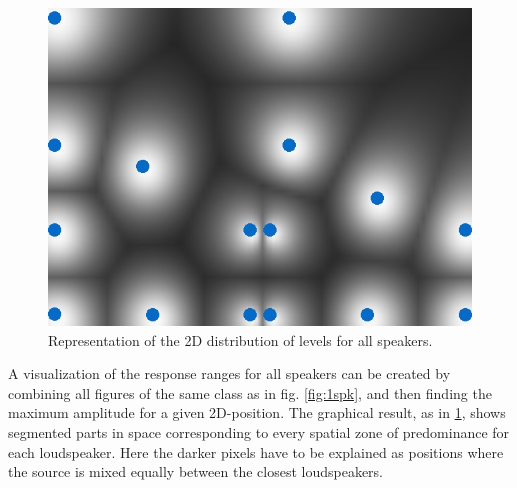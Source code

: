\documentclass[twoside,10pt]{article}
\begin{document}
\begin{figure}[ht]
\centerline{\includegraphics[scale=0.5]{all_r_6_b_0}}
\caption{Representation of the 2D distribution of levels for all speakers.}  
\label{fig:allspk2}
\end{figure}
A visualization of the response ranges for all speakers can be created by combining all figures of the same class as in fig. \ref{fig:1spk}, and then finding the maximum amplitude for a given 2D-position. The graphical result, as in \ref{fig:allspk2}, shows segmented parts in space corresponding to every spatial zone of predominance for each loudspeaker. Here the darker pixels have to be explained as positions where the source is mixed equally between the closest loudspeakers. %
\end{document}

